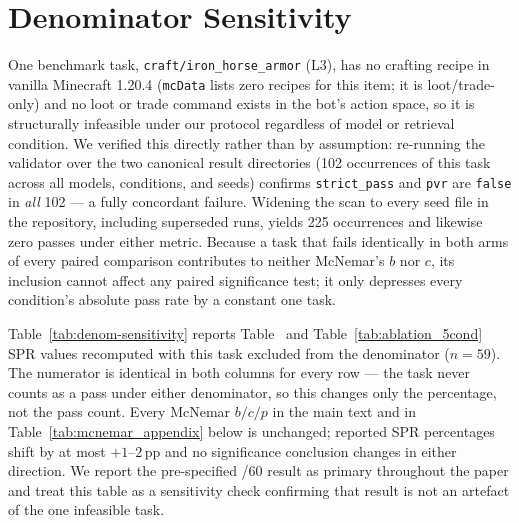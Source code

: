 \documentclass[letterpaper]{article} %
\newcommand{\bodyref}[1]{\getrefnumber{#1}}
\begin{document}
\section{Denominator Sensitivity}
\label{app:denom}
One benchmark task, \texttt{craft/iron\_horse\_armor} (L3), has no
crafting recipe in vanilla Minecraft 1.20.4 (\texttt{mcData} lists zero
recipes for this item; it is loot/trade-only) and no loot or trade
command exists in the bot's action space, so it is structurally
infeasible under our protocol regardless of model or retrieval
condition. We verified this directly rather than by assumption:
re-running the validator over the two canonical result directories
(102 occurrences of this task across all models, conditions, and
seeds) confirms \texttt{strict\_pass} and \texttt{pvr} are
\texttt{false} in \emph{all} 102 --- a fully concordant failure.
Widening the scan to every seed file in the repository, including
superseded runs, yields 225 occurrences and likewise zero passes under
either metric.
Because a task that fails identically in both arms of every paired
comparison contributes to neither McNemar's $b$ nor $c$, its inclusion
cannot affect any paired significance test; it only depresses every
condition's absolute pass rate by a constant one task.

Table~\ref{tab:denom-sensitivity} reports Table~\bodyref{tab:main} and
Table~\ref{tab:ablation_5cond} SPR values recomputed with
this task excluded from the denominator ($n{=}59$). The numerator is
identical in both columns for every row --- the task never counts as a
pass under either denominator, so this changes only the percentage,
not the pass count. Every McNemar $b/c/p$ in the main text and in
Table~\ref{tab:mcnemar_appendix} below is unchanged; reported SPR percentages shift by at most $+1$--$2$\,pp and
no significance conclusion changes in either direction. We report the
pre-specified /60 result as primary throughout the paper and treat this
table as a sensitivity check confirming that result is not an artefact
of the one infeasible task.
\end{document}
